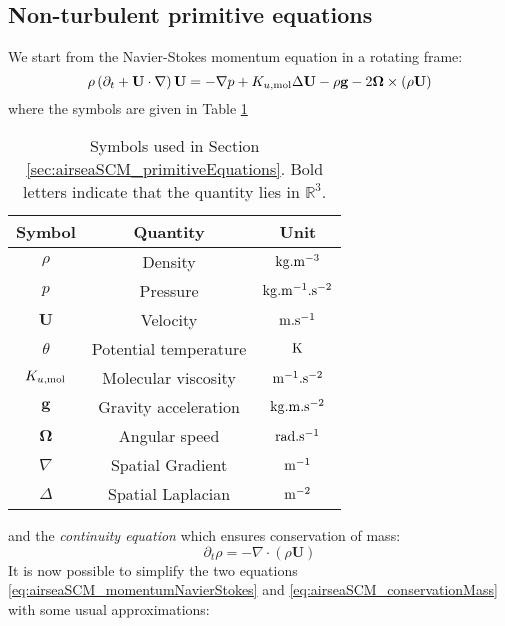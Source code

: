\subsection{Non-turbulent primitive equations}
We start from the Navier-Stokes momentum equation in a rotating frame:
\begin{equation}
\label{eq:airseaSCM_momentumNavierStokes}
\rho \left(\partial_t + \mathbf{U} \cdot \nabla \right) \mathbf{U}
= - \nabla p + K_{u, {\rm mol}} \Delta \mathbf{U} - \rho \mathbf{g}
- 2 \mathbf{\Omega} \times (\rho \mathbf{U})
\end{equation}
where the symbols are given in Table
\ref{tab:airseaSCM_primitiveEquationsSymbols}
\begin{table}
\centering
\begin{tabular}{c|c|c}
Symbol & Quantity & Unit \\
\hline
$\rho$& {Density} & ${\rm kg}.{\rm m}^{-3}$ \\
$p$   & {Pressure} & ${\rm kg}.{\rm m}^{-1}.{\rm s}^{-2}$ \\
$\mathbf{U}$ & {Velocity}& ${\rm m}.{\rm s}^{-1}$ \\
$\theta$ & {Potential temperature}& ${\rm K}$ \\
$K_{u, {\rm mol}}$ & {Molecular viscosity}& ${\rm m}^{-1}.{\rm s}^{-2}$ \\
$\mathbf{g}$ & {Gravity acceleration}& ${\rm kg}.{\rm m}.{\rm s}^{-2}$ \\
$\mathbf{\Omega}$ & {Angular speed}& ${\rm rad}.{\rm s}^{-1}$ \\
$\nabla$ & {Spatial Gradient} & ${\rm m}^{-1}$\\
$\Delta$ & {Spatial Laplacian} &${\rm m}^{-2}$
\end{tabular}
\caption{Symbols used in Section
\ref{sec:airseaSCM_primitiveEquations}. Bold letters
indicate that the quantity lies in $\mathbb{R}^3$.}
\label{tab:airseaSCM_primitiveEquationsSymbols}
\end{table}
and the \textit{continuity equation} which ensures
conservation of mass:
\begin{equation}
\label{eq:airseaSCM_conservationMass}
\partial_t \rho = - \nabla \cdot (\rho \mathbf{U})
\end{equation}
It is now possible to simplify the two equations
\eqref{eq:airseaSCM_momentumNavierStokes} and
\eqref{eq:airseaSCM_conservationMass} with
some usual approximations:

